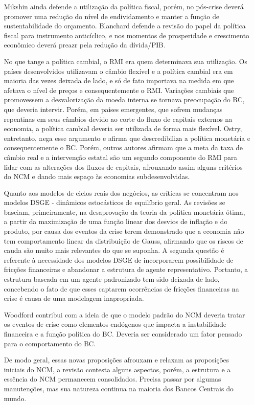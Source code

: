 \documentclass[report]{uftex}
\begin{document}
Mikshin ainda defende a utilização da política fiscal, porém, no pós-crise deverá promover uma redução do nível de endividamento e manter a função de sustentabilidade do orçamento. Blanchard defende a revisão do papel da política fiscal para instrumento anticíclico, e nos momentos de prosperidade e crescimento econômico deverá preazr pela redução da dívida/PIB. 

No que tange a política cambial, o RMI era quem determinava sua utilização. Os países desenvolvidos utilizavam o câmbio flexível e a política cambial era em maioria das vezes deixada de lado, e só de fato importava na medida em que afetava o nível de preços e consequentemente o RMI. Variações cambiais que promovessem a desvalorização da moeda interna se tornava preocupação do BC, que deveria intervir. Porém, em países emergentes, que sofrem mudanças repentinas em seus câmbios devido ao corte do fluxo de capitais externos na economia, a política cambial deveria ser utilizada de forma mais flexível. Ostry, entretanto, nega esse argumento e afirma que descredibiliza a política monetária e consequentemente o BC. Porém, outros autores afirmam que a meta da taxa de câmbio real e a intervenção estatal são um segundo componente do RMI para lidar com as alterações dos fluxos de capitais, afrouxando assim alguns critérios do NCM e dando mais espaço às economias subdesenvolvidas. 

Quanto aos modelos de ciclos reais dos negócios, as críticas se concentram nos modelos DSGE - dinâmicos estocásticos de equilíbrio geral. As revisões se baseiam, primeiramente, na desaprovação da teoria da política monetária ótima, a partir da maximização de uma função linear dos desvios de inflação e do produto, por causa dos eventos da crise terem demonstrado que a economia não tem comportamento linear da distribuição de Gauss, afirmando que os riscos de cauda são muito mais relevantes do que se suponha. A segunda questão é referente à necessidade dos modelos DSGE de incorporarem possibilidade de fricções financeiras e abandonar a estrutura de agente representativo. Portanto, a estrutura baseada em um agente padronizado tem sido deixada de lado, concebendo o fato de que esses captarem ocorrências de fricções financeiras na crise é causa de uma modelagem inapropriada.

Woodford contribui com a ideia de que o modelo padrão do NCM deveria tratar os eventos de crise como elementos endógenos que impacta a instabilidade financeira e a função política do BC. Deveria ser considerado um fator pensado para o comportamento do BC.

De modo geral, essas novas proposições afrouxam e relaxam as proposições iniciais do NCM, a revisão contesta alguns aspectos, porém, a estrutura e a essência do NCM permanecem consolidados. Precisa passar por algumas manutenções, mas sua natureza continua na maioria dos Bancos Centrais do mundo.  
 
\end{document}
